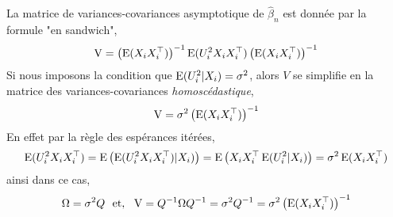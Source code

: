 \begin{remarque}\label{re2}
La matrice de variances-covariances asymptotique de $\hat{\beta}_n$ est donnée par la formule "en sandwich",
\begin{align*}
\operatorname{V} = \left(\operatorname{E}(X_iX_i^\top)\right)^{-1} \operatorname{E}(U_i^2X_iX_i^\top) \left(\operatorname{E}(X_iX_i^\top)\right)^{-1}
\end{align*}
Si nous imposons la condition que $\operatorname{E}(U_i^2|X_i) = \sigma^2$, alors $V$ se simplifie en la matrice des variances-covariances \emph{homoscédastique},
\begin{align}
\operatorname{V} = \sigma^2\left(\operatorname{E}(X_iX_i^\top)\right)^{-1}
\label{eq4}
\end{align}
En effet par la règle des espérances itérées,
\begin{align*}
\operatorname{E}(U_i^2X_iX_i^\top) = \operatorname{E}\left(\operatorname{E}(U_i^2X_iX_i^\top) | X_i) \right) = \operatorname{E}\left(X_iX_i^\top\operatorname{E}(U_i^2|X_i)\right) = \sigma^2\operatorname{E}(X_iX_i^\top)
\end{align*}
ainsi dans ce cas, 
\begin{align*}
\Omega = \sigma^2 Q \ \ \textrm{et,} \ \ \operatorname{V} = Q^{-1}\Omega  Q^{-1} = \sigma^2  Q^{-1} =\sigma^2\left(\operatorname{E}(X_iX_i^\top)\right)^{-1}
\end{align*}
\end{remarque}

